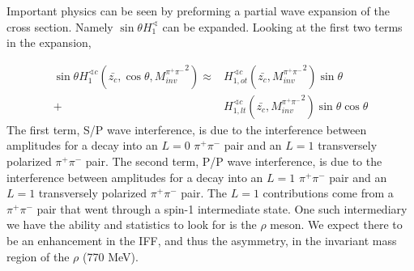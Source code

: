 \documentclass[abstract = on,listof=totoc, bibliography=totoc]{scrreprt}
\newcommand{\mpair}{M_{inv}^{\pi^+\pi^-}}
\newcommand{\pip}{\pi^+}
\newcommand{\pim}{\pi^-}
\newcommand{\pair}{$\pip\pim$ }
\begin{document}
Important physics can be seen by preforming a partial wave expansion of the cross section. Namely $\sin \theta H_1^\sphericalangle$ can be expanded. Looking at the first two terms in the expansion, 


\begin{align}
\label{eq:partialwaveexpansion}
\sin \theta H_1^{\sphericalangle c} (\bar{z_c},\cos \theta, {\mpair}^2) \approx &H^{\sphericalangle c}_{1,ot}(\bar{z_c},{\mpair}^2) \sin\theta \nonumber \\
+ &H^{\sphericalangle c}_{1,lt}(\bar{z_c},{\mpair}^2) \sin\theta \cos\theta
\end{align}
%
The first term, S/P wave interference, is due to the interference between amplitudes for a decay into an $L = 0$  \pair pair and an $L = 1$ transversely polarized \pair pair. The second term, P/P wave interference, is due to the interference between amplitudes for a decay into an $L = 1$ \pair pair and an $L = 1$ transversely polarized \pair pair. The $L=1$ contributions come from a \pair pair that went through a spin-1 intermediate state. One such intermediary we have the ability and statistics to look for is the $\rho$ meson. We expect there to be an enhancement in the IFF, and thus the asymmetry, in the invariant mass region of the $\rho$ (770 MeV). \cite{bacchettaRedici2, Tang}    
\end{document}
